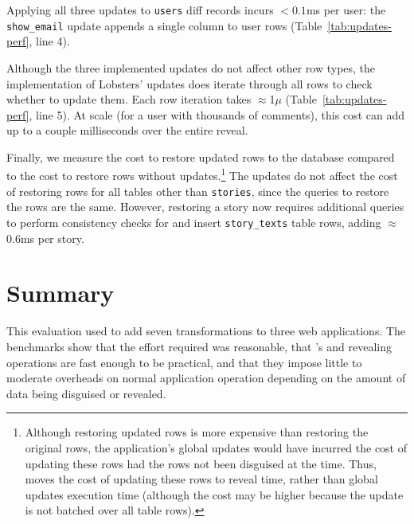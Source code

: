 %
Applying all three updates to \texttt{users} diff records incurs $<0.1$ms per
user: the \texttt{show\_email} update appends a single column to user rows
(Table~\ref{tab:updates-perf}, line 4).
%

%
Although the three implemented updates do not affect other row types, the
implementation of Lobsters' updates does iterate through all rows to check
whether to update them. Each row iteration takes $\approx$1$\mu$
(Table~\ref{tab:updates-perf}, line 5). At scale (\eg for a user with thousands
of comments), this cost can add up to a couple milliseconds over the entire
reveal.
%

Finally, we measure the cost to restore updated rows to the database compared to
the cost to restore rows without updates.\footnote{Although restoring updated
rows is more expensive than restoring the original rows, the application's
global updates would have incurred the cost of updating these rows had the rows not
been disguised at the time. Thus, \sys moves the cost of updating these rows to
reveal time, rather than global updates execution time (although the cost may be higher
because the update is not batched over all table rows).}
%
The updates do not affect the cost of restoring rows for all tables other than
\texttt{stories}, since the queries to restore the rows are the same.  However,
restoring a story now requires additional queries to perform consistency checks
for and insert \texttt{story\_texts} table rows, adding $\approx$0.6ms per
story.
%

%
\section{Summary} 
This evaluation used \sys to add seven \xxing transformations to three web
applications. The benchmarks show that the effort required was reasonable, that
\sys's \xxing and revealing operations are fast enough to be practical, and that
they impose little to moderate overheads on normal application operation
depending on the amount of data being disguised or revealed.
%
